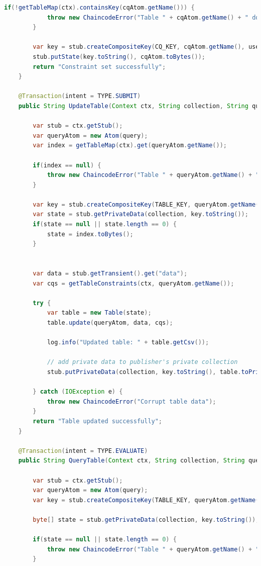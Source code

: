 \documentclass[12pt]{article}
\begin{document}
\begin{lstlisting}[style=java, language=java]
        if(!getTableMap(ctx).containsKey(cqAtom.getName())) {
            throw new ChaincodeError("Table " + cqAtom.getName() + " does not exist");
        }

        var key = stub.createCompositeKey(CQ_KEY, cqAtom.getName(), user);
        stub.putState(key.toString(), cqAtom.toBytes());
        return "Constraint set successfully";
    }

    @Transaction(intent = TYPE.SUBMIT)
    public String UpdateTable(Context ctx, String collection, String query) {

        var stub = ctx.getStub();
        var queryAtom = new Atom(query);
        var index = getTableMap(ctx).get(queryAtom.getName());

        if(index == null) {
            throw new ChaincodeError("Table " + queryAtom.getName() + " does not exist");
        }

        var key = stub.createCompositeKey(TABLE_KEY, queryAtom.getName());
        var state = stub.getPrivateData(collection, key.toString());
        if(state == null || state.length == 0) {
            state = index.toBytes();
        }


        var data = stub.getTransient().get("data");
        var cqs = getTableConstraints(ctx, queryAtom.getName());

        try {
            var table = new Table(state);
            table.update(queryAtom, data, cqs);

            log.info("Updated table: " + table.getCsv());

            // add private data to publisher's private collection
            stub.putPrivateData(collection, key.toString(), table.toPrivateBytes());

        } catch (IOException e) {
            throw new ChaincodeError("Corrupt table data");
        }
        return "Table updated successfully";
    }

    @Transaction(intent = TYPE.EVALUATE)
    public String QueryTable(Context ctx, String collection, String query) {

        var stub = ctx.getStub();
        var queryAtom = new Atom(query);
        var key = stub.createCompositeKey(TABLE_KEY, queryAtom.getName());

        byte[] state = stub.getPrivateData(collection, key.toString());

        if(state == null || state.length == 0) {
            throw new ChaincodeError("Table " + queryAtom.getName() + " in " + collection + " not found");
        }


\end{lstlisting}
\end{document}
